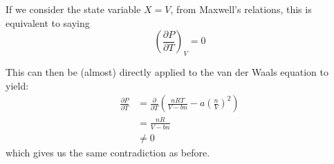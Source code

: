 \documentclass[a4paper]{scrartcl}
\begin{document}
If we consider the state variable \(X = V\), from Maxwell's relations, this is equivalent to saying
\[\left(\frac{\partial P}{\partial T}\right)_V = 0\]

This can then be (almost) directly applied to the van der Waals equation to yield:
\begin{align*}
    \frac{\partial P}{\partial T} &= \frac{\partial}{\partial T} \left(\frac{n R T}{V - b n} - a \left(\frac{n}{V}\right)^2\right) \\
    &= \frac{n R}{V - b n} \\
    &\ne 0
\end{align*}
which gives us the same contradiction as before.
\end{document}
